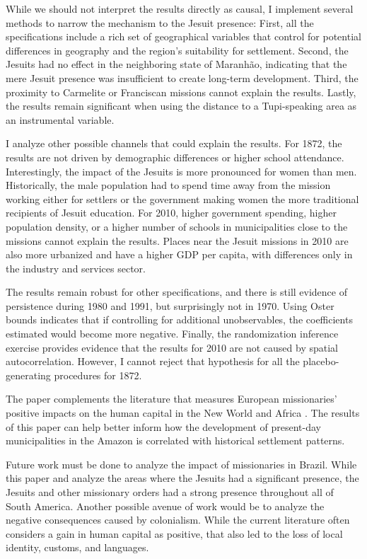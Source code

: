 \documentclass{article}
\begin{document}
While we should not interpret the results directly as causal, I implement several methods to narrow the mechanism to the Jesuit presence:
First, all the specifications include a rich set of geographical variables that control for potential differences in geography and the region's suitability for settlement. 
Second, the Jesuits had no effect in the neighboring state of Maranhão, indicating that the mere Jesuit presence was insufficient to create long-term development. 
Third, the proximity to Carmelite or Franciscan missions cannot explain the results. 
Lastly, the results remain significant when using the distance to a Tupi-speaking area as an instrumental variable.

I analyze other possible channels that could explain the results.
For 1872, the results are not driven by demographic differences or higher school attendance.
Interestingly,  the impact of the Jesuits is more pronounced for women than men. 
Historically, the male population had to spend time away from the mission working either for settlers or the government making women the more traditional recipients of Jesuit education. 
For 2010, higher government spending, higher population density, or a higher number of schools in municipalities close to the missions cannot explain the results. 
Places near the Jesuit missions in 2010 are also more urbanized and have a higher GDP per capita, with differences only in the industry and services sector.

The results remain robust for other specifications, and there is still evidence of persistence during 1980 and 1991, but surprisingly not in 1970.
Using Oster bounds indicates that if controlling for additional unobservables, the coefficients estimated would become more negative. 
Finally, the randomization inference exercise provides evidence that the results for 2010 are not caused by spatial autocorrelation. 
However, I cannot reject that hypothesis for all the placebo-generating procedures for 1872.

The paper complements the literature that measures European missionaries' positive impacts on the human capital in the New World and Africa \parencite{Barsanetti2021-hp, Franco2021-vn, Waldinger2017-rz, Cage2016-kk, Wantchekon2015-ry, Nunn2014-tj, Nunn2010-ls, Gallego2010-bn, Dell2010-qt}. 
The results of this paper can help better inform how the development of present-day municipalities in the Amazon is correlated with historical settlement patterns.

Future work must be done to analyze the impact of missionaries in Brazil. While this paper and \textcite{Valencia_Caicedo2018-gp} analyze the areas where the Jesuits had a significant presence, the Jesuits and other missionary orders had a strong presence throughout all of South America. Another possible avenue of work would be to analyze the negative consequences caused by colonialism. While the current literature often considers a gain in human capital as positive, that also led to the loss of local identity, customs, and languages. 
\end{document}
